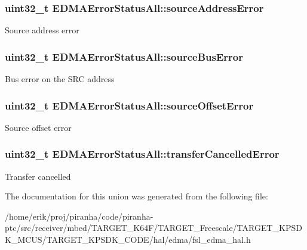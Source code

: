 \subsubsection[{\texorpdfstring{source\+Address\+Error}{sourceAddressError}}]{\setlength{\rightskip}{0pt plus 5cm}uint32\+\_\+t E\+D\+M\+A\+Error\+Status\+All\+::source\+Address\+Error}\hypertarget{unionEDMAErrorStatusAll_ae403b5943b4d12038ecf885fb3a707fb}{}\label{unionEDMAErrorStatusAll_ae403b5943b4d12038ecf885fb3a707fb}
Source address error 
\subsubsection[{\texorpdfstring{source\+Bus\+Error}{sourceBusError}}]{\setlength{\rightskip}{0pt plus 5cm}uint32\+\_\+t E\+D\+M\+A\+Error\+Status\+All\+::source\+Bus\+Error}\hypertarget{unionEDMAErrorStatusAll_a8e44c7e3184403d0af77b40cd9c68ba1}{}\label{unionEDMAErrorStatusAll_a8e44c7e3184403d0af77b40cd9c68ba1}
Bus error on the S\+RC address 
\subsubsection[{\texorpdfstring{source\+Offset\+Error}{sourceOffsetError}}]{\setlength{\rightskip}{0pt plus 5cm}uint32\+\_\+t E\+D\+M\+A\+Error\+Status\+All\+::source\+Offset\+Error}\hypertarget{unionEDMAErrorStatusAll_a82039eea24032f54e0c4ab85166480e3}{}\label{unionEDMAErrorStatusAll_a82039eea24032f54e0c4ab85166480e3}
Source offset error 
\subsubsection[{\texorpdfstring{transfer\+Cancelled\+Error}{transferCancelledError}}]{\setlength{\rightskip}{0pt plus 5cm}uint32\+\_\+t E\+D\+M\+A\+Error\+Status\+All\+::transfer\+Cancelled\+Error}\hypertarget{unionEDMAErrorStatusAll_af1d3f5878d0d18e3c39f13493e4d6f11}{}\label{unionEDMAErrorStatusAll_af1d3f5878d0d18e3c39f13493e4d6f11}
Transfer cancelled 

The documentation for this union was generated from the following file\+:\begin{DoxyCompactItemize}
\item 
/home/erik/proj/piranha/code/piranha-\/ptc/src/receiver/mbed/\+T\+A\+R\+G\+E\+T\+\_\+\+K64\+F/\+T\+A\+R\+G\+E\+T\+\_\+\+Freescale/\+T\+A\+R\+G\+E\+T\+\_\+\+K\+P\+S\+D\+K\+\_\+\+M\+C\+U\+S/\+T\+A\+R\+G\+E\+T\+\_\+\+K\+P\+S\+D\+K\+\_\+\+C\+O\+D\+E/hal/edma/fsl\+\_\+edma\+\_\+hal.\+h\end{DoxyCompactItemize}
